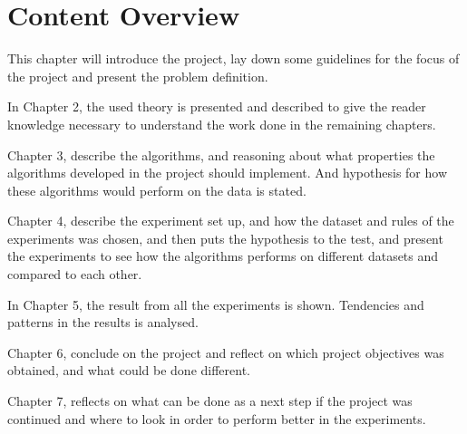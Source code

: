 \section{Content Overview}
This chapter will introduce the project, lay down some guidelines for the focus of the project and present the problem definition.

In Chapter 2, the used theory is presented and described to give the reader knowledge necessary to understand the work done in the remaining chapters.

Chapter 3, describe the algorithms, and reasoning about what properties the algorithms developed in the project should implement. And hypothesis for how these algorithms would perform on the data is stated.

Chapter 4, describe the experiment set up, and how the dataset and rules of the experiments was chosen, and then puts the hypothesis to the test, and present the experiments to see how the algorithms performs on different datasets and compared to each other.

In Chapter 5, the result from all the experiments is shown. Tendencies and patterns in the results is analysed.

Chapter 6, conclude on the project and reflect on which project objectives was obtained, and what could be done different.

Chapter 7, reflects on what can be done as a next step if the project was continued and where to look in order to perform better in the experiments.